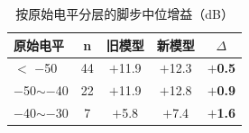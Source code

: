\begin{table}[htbp]\centering
\caption{按原始电平分层的脚步中位增益（dB）}\label{tab:nm_level}
{\small\begin{threeparttable}
\begin{tabular}{lcccc}\toprule
原始电平 & n & 旧模型 & 新模型 & $\Delta$ \\
\midrule
$<$ $-$50 & 44 & $+$11.9 & $+$12.3 & \textbf{$+$0.5} \\
$-$50$\sim$$-$40 & 22 & $+$11.9 & $+$12.8 & \textbf{$+$0.9} \\
$-$40$\sim$$-$30 & 7 & $+$5.8 & $+$7.4 & \textbf{$+$1.6} \\
\bottomrule\end{tabular}
\end{threeparttable}}
\end{table}
